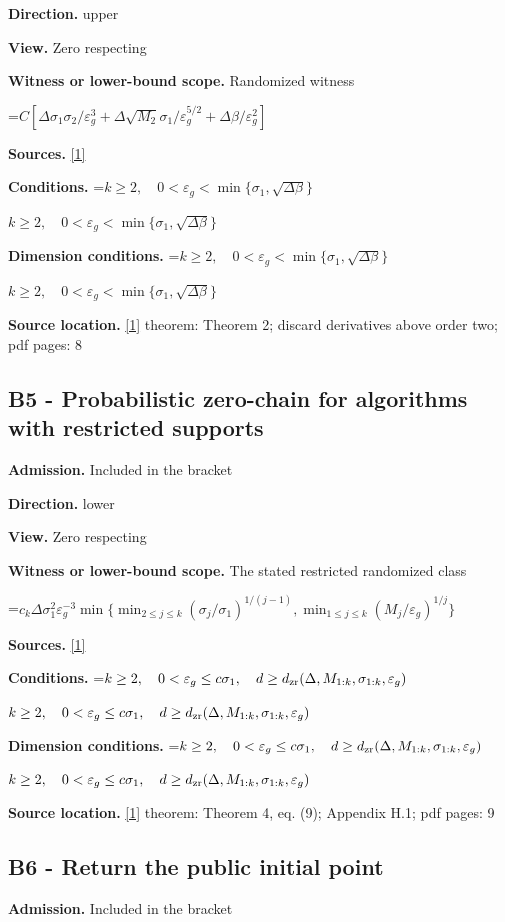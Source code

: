 \documentclass[10pt,a4paper]{article}
\newcommand{\AtlasMath}[1]{\par\begingroup\centering\setbox0=\hbox{$\displaystyle #1$}\ifdim\wd0>1.4\linewidth\typeout{ATLAS WIDE FORMULA: \the\wd0}\fi\ifdim\wd0>\linewidth\resizebox{\linewidth}{!}{\box0}\else\box0\fi\par\endgroup}
\newcommand{\AtlasInlineMath}[1]{\begingroup\setbox0=\hbox{$#1$}\ifdim\wd0>.4\linewidth\endgroup\AtlasMath{#1}\else\endgroup$#1$\fi}
\begin{document}
\textbf{Direction.} upper

\textbf{View.} Zero respecting

\textbf{Witness or lower-bound scope.} Randomized witness

\AtlasMath{C[\Delta\sigma_1\sigma_2/\varepsilon_g^3+\Delta\sqrt{M_2}\sigma_1/\varepsilon_g^{5/2}+\Delta\beta/\varepsilon_g^2]}
\textbf{Sources.} \href{https://proceedings.mlr.press/v125/arjevani20a/arjevani20a.pdf}{[1]}

\textbf{Conditions.} \AtlasInlineMath{k\ge2,\quad0<\varepsilon_g<\min\{\sigma_1,\sqrt{\Delta\beta}\}}

\textbf{Dimension conditions.} \AtlasInlineMath{k\ge2,\quad0<\varepsilon_g<\min\{\sigma_1,\sqrt{\Delta\beta}\}}

\textbf{Source location.} \href{https://proceedings.mlr.press/v125/arjevani20a/arjevani20a.pdf}{[1]} theorem: Theorem 2; discard derivatives above order two; pdf pages: 8

\subsection{B5 - Probabilistic zero-chain for algorithms with restricted supports}
\textbf{Admission.} Included in the bracket

\textbf{Direction.} lower

\textbf{View.} Zero respecting

\textbf{Witness or lower-bound scope.} The stated restricted randomized class

\AtlasMath{c_k\Delta\sigma_1^2\varepsilon_g^{-3}\min\{\min_{2\le j\le k}(\sigma_j/\sigma_1)^{1/(j-1)},\min_{1\le j\le k}(M_j/\varepsilon_g)^{1/j}\}}
\textbf{Sources.} \href{https://proceedings.mlr.press/v125/arjevani20a/arjevani20a.pdf}{[1]}

\textbf{Conditions.} \AtlasInlineMath{k\ge2,\quad0<\varepsilon_g\le c\sigma_1,\quad d\ge d_{\rm zr}(\Delta,M_{1:k},\sigma_{1:k},\varepsilon_g)}

\textbf{Dimension conditions.} \AtlasInlineMath{k\ge2,\quad0<\varepsilon_g\le c\sigma_1,\quad d\ge d_{\rm zr}(\Delta,M_{1:k},\sigma_{1:k},\varepsilon_g)}

\textbf{Source location.} \href{https://proceedings.mlr.press/v125/arjevani20a/arjevani20a.pdf}{[1]} theorem: Theorem 4, eq. (9); Appendix H.1; pdf pages: 9

\subsection{B6 - Return the public initial point}
\textbf{Admission.} Included in the bracket
\end{document}

